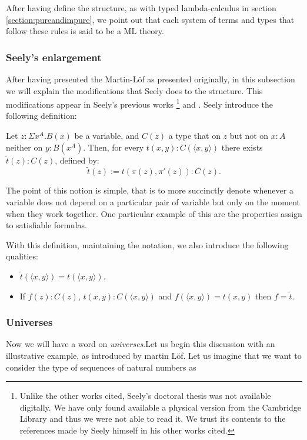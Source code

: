 \begin{remark}
  After having define the structure, as with typed lambda-calculus in section \ref{section:pureandimpure}, we point out that each system of terms and types that follow these rules is said to be a ML theory. 
\end{remark}
\subsubsection{Seely's enlargement}

After having presented the Martin-L\"of as presented originally, in this subsection we will explain the modifications that Seely does to the structure. This modifications appear in Seely's previous works \cite{seely1977hyperdoctrines}\footnote{Unlike the other works cited, Seely's doctoral thesis was not available digitally. We have only found available a physical version from the Cambridge Library and thus we were not able to read it. We trust its contents to the references made by Seely himself in his other works cited.} and \cite{seely1983hyperdoctrines}. Seely introduce the following definition:

\begin{definition}
  Let $z : \Sigma x^A.B(x)$ be a variable, and $C(z)$ a type that on $z$ but not on $x:A$ neither on $y:B(x^A)$. Then, for every $t(x,y) : C(\langle x, y\rangle)$ there exists $\tilde t (z) : C(z)$, defined by:
  $$\tilde t (z) := t(\pi(z),\pi'(z)): C(z).$$
\end{definition}

The point of this notion is simple, that is to more succinctly denote whenever a variable does not depend on a particular pair of variable but only on the moment when they work together. One particular example of this are the properties assign to satisfiable formulas.

With this definition, maintaining the notation, we also introduce the following qualities:
\begin{itemize}
\item $\tilde t(\langle x,y\rangle) = t(\langle x,y\rangle) $.
\item If $f(z): C(z)$, $t(x,y):C(\langle x,y\rangle)$ and $f(\langle x,y\rangle) = t(x,y)$ then $f=\tilde t$.

\end{itemize}


\subsubsection{Universes}
Now we will have a word on \emph{universes}.Let us begin this discussion with an illustrative example, as introduced by martin Löf. Let us imagine that we want to consider the type of sequences of natural numbers as 

